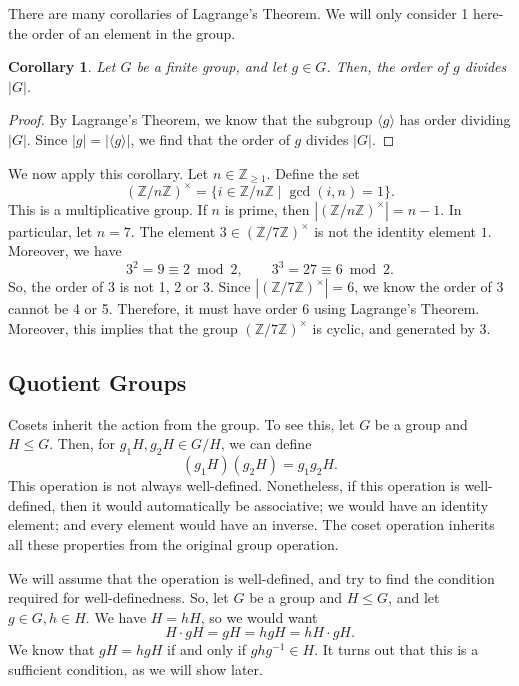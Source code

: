 \documentclass[a4paper, openany]{memoir}
\theoremstyle{definition}
\theoremstyle{plain}
\newtheorem{corollary}[definition]{Corollary}
\begin{document}
There are many corollaries of Lagrange's Theorem. We will only consider 1 here- the order of an element in the group.
\begin{corollary}
Let $G$ be a finite group, and let $g \in G$. Then, the order of $g$ divides $|G|$.
\end{corollary}
\begin{proof}
By Lagrange's Theorem, we know that the subgroup $\langle g \rangle$ has order dividing $|G|$. Since $|g| = |\langle g \rangle|$, we find that the order of $g$ divides $|G|$.
\end{proof}
\noindent We now apply this corollary. Let $n \in \mathbb{Z}_{\geqslant 1}$. Define the set
\[(\mathbb{Z}/n \mathbb{Z})^\times = \{i \in \mathbb{Z}/n \mathbb{Z} \mid \gcd(i, n) = 1\}.\]
This is a multiplicative group. If $n$ is prime, then $|(\mathbb{Z}/n \mathbb{Z})^\times| = n-1$. In particular, let $n = 7$. The element $3 \in (\mathbb{Z}/7 \mathbb{Z})^\times$ is not the identity element $1$. Moreover, we have
\[3^2 = 9\equiv 2 \bmod{2}, \qquad 3^3 = 27 \equiv 6 \bmod{2}.\]
So, the order of $3$ is not 1, 2 or 3. Since $|(\mathbb{Z}/7 \mathbb{Z})^\times| = 6$, we know the order of $3$ cannot be 4 or 5. Therefore, it must have order $6$ using Lagrange's Theorem. Moreover, this implies that the group $(\mathbb{Z}/7 \mathbb{Z})^\times$ is cyclic, and generated by $3$.

\subsection{Quotient Groups}
Cosets inherit the action from the group. To see this, let $G$ be a group and $H \leqslant G$. Then, for $g_1H, g_2H \in G/H$, we can define
\[(g_1H)(g_2H) = g_1g_2H.\]
This operation is not always well-defined. Nonetheless, if this operation is well-defined, then it would automatically be associative; we would have an identity element; and every element would have an inverse. The coset operation inherits all these properties from the original group operation.

We will assume that the operation is well-defined, and try to find the condition required for well-definedness. So, let $G$ be a group and $H \leqslant G$, and let $g \in G, h \in H$. We have $H = hH$, so we would want
\[H \cdot gH = gH = hgH = hH \cdot gH.\]
We know that $gH = hgH$ if and only if $ghg^{-1} \in H$. It turns out that this is a sufficient condition, as we will show later.
\end{document}
